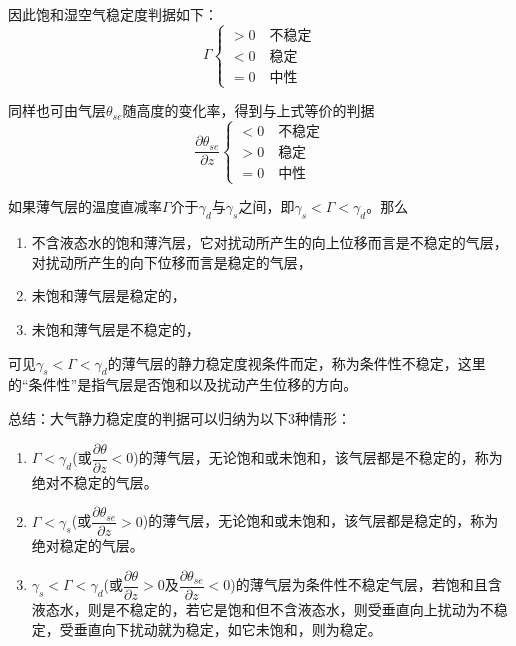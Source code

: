 \documentclass[UTF8,a4paper,11pt,oneside]{ctexbook}
\begin{document}
因此饱和湿空气稳定度判据如下：
\begin{equation}
\Gamma\begin{cases}
    >0\quad\text{不稳定}\\
    <0\quad\text{稳定}\\
    =0\quad\text{中性}
\end{cases}
\end{equation}

同样也可由气层\(\theta{}_{se}\)随高度的变化率，得到与上式等价的判据
\begin{equation}
\dfrac{\partial{}\theta{}_{se}}{\partial{}z}\begin{cases}
    <0\quad\text{不稳定}\\
    >0\quad\text{稳定}\\
    =0\quad\text{中性}
\end{cases}
\end{equation}

如果薄气层的温度直减率\(\Gamma\)介于\(\gamma_d\)与\(\gamma_s\)之间，即\(\gamma_s<\Gamma<\gamma_d\)。那么
\begin{enumerate}
    \item 不含液态水的饱和薄汽层，它对扰动所产生的向上位移而言是不稳定的气层，对扰动所产生的向下位移而言是稳定的气层，
    \item 未饱和薄气层是稳定的，
    \item 未饱和薄气层是不稳定的，
\end{enumerate}

可见\(\gamma_s<\Gamma<\gamma_d\)的薄气层的静力稳定度视条件而定，称为条件性不稳定，这里的“条件性”是指气层是否饱和以及扰动产生位移的方向。

总结：大气静力稳定度的判据可以归纳为以下3种情形：
\begin{enumerate}
    \item \(\Gamma<\gamma_d\)(或\(\dfrac{\partial{}\theta}{\partial{}z}<0\))的薄气层，无论饱和或未饱和，该气层都是不稳定的，称为绝对不稳定的气层。
    \item \(\Gamma<\gamma_s\)(或\(\dfrac{\partial{}\theta_{se}}{\partial{}z}>0\))的薄气层，无论饱和或未饱和，该气层都是稳定的，称为绝对稳定的气层。
    \item \(\gamma_s<\Gamma<\gamma_d\)(或\(\dfrac{\partial{}\theta}{\partial{}z}>0\text{及}\dfrac{\partial{}\theta_{se}}{\partial{}z}<0\))的薄气层为条件性不稳定气层，若饱和且含液态水，则是不稳定的，若它是饱和但不含液态水，则受垂直向上扰动为不稳定，受垂直向下扰动就为稳定，如它未饱和，则为稳定。
\end{enumerate}
\end{document}
